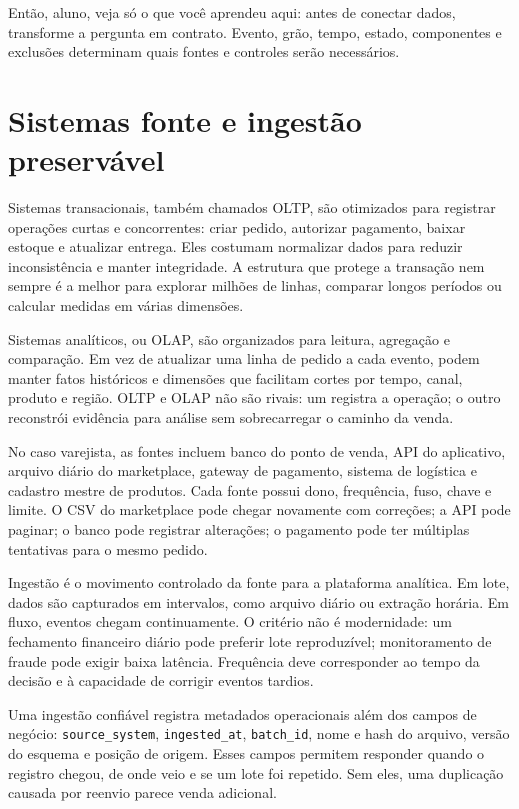 \begin{SummaryBox}
Então, aluno, veja só o que você aprendeu aqui: antes de conectar dados, transforme a pergunta em contrato. Evento, grão, tempo, estado, componentes e exclusões determinam quais fontes e controles serão necessários.
\end{SummaryBox}

\section{Sistemas fonte e ingestão preservável}

Sistemas transacionais, também chamados OLTP, são otimizados para registrar operações curtas e concorrentes: criar pedido, autorizar pagamento, baixar estoque e atualizar entrega. Eles costumam normalizar dados para reduzir inconsistência e manter integridade. A estrutura que protege a transação nem sempre é a melhor para explorar milhões de linhas, comparar longos períodos ou calcular medidas em várias dimensões.

Sistemas analíticos, ou OLAP, são organizados para leitura, agregação e comparação. Em vez de atualizar uma linha de pedido a cada evento, podem manter fatos históricos e dimensões que facilitam cortes por tempo, canal, produto e região. OLTP e OLAP não são rivais: um registra a operação; o outro reconstrói evidência para análise sem sobrecarregar o caminho da venda.

No caso varejista, as fontes incluem banco do ponto de venda, API do aplicativo, arquivo diário do marketplace, gateway de pagamento, sistema de logística e cadastro mestre de produtos. Cada fonte possui dono, frequência, fuso, chave e limite. O CSV do marketplace pode chegar novamente com correções; a API pode paginar; o banco pode registrar alterações; o pagamento pode ter múltiplas tentativas para o mesmo pedido.

Ingestão é o movimento controlado da fonte para a plataforma analítica. Em lote, dados são capturados em intervalos, como arquivo diário ou extração horária. Em fluxo, eventos chegam continuamente. O critério não é modernidade: um fechamento financeiro diário pode preferir lote reproduzível; monitoramento de fraude pode exigir baixa latência. Frequência deve corresponder ao tempo da decisão e à capacidade de corrigir eventos tardios.

Uma ingestão confiável registra metadados operacionais além dos campos de negócio: \texttt{source\_system}, \texttt{ingested\_at}, \texttt{batch\_id}, nome e hash do arquivo, versão do esquema e posição de origem. Esses campos permitem responder quando o registro chegou, de onde veio e se um lote foi repetido. Sem eles, uma duplicação causada por reenvio parece venda adicional.

